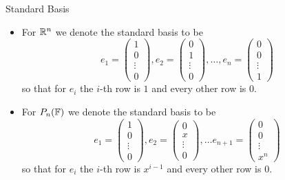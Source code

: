 \documentclass{exam}
\begin{document}
    \begin{example}{Standard Basis}{}
        \begin{itemize}
            \item For $\mathbb R^{n}$ we denote the standard basis to be 
            \[
                e_1 = \begin{pmatrix}
                    1 \\ 0 \\ \vdots \\ 0
                \end{pmatrix}, e_2 = \begin{pmatrix}
                    0 \\ 1 \\ \vdots \\ 0
                \end{pmatrix}, \dots, e_n = \begin{pmatrix}
                    0 \\ 0 \\ \vdots \\ 1
                \end{pmatrix}
            \]
            so that for $e_i$ the $i$-th row is $1$ and every other row is $0$. 

            \item For $P_n(\mathbb F)$ we denote the standard basis to be 
            \[
                e_1 = \begin{pmatrix}
                    1 \\ 0 \\ \vdots \\ 0
                \end{pmatrix},
                e_2 = \begin{pmatrix}
                    0 \\ x \\ \vdots \\ 0
                \end{pmatrix},
                \dots e_{n+1} = \begin{pmatrix}
                    0 \\ 0 \\ \vdots \\ x^{n}
                \end{pmatrix}
            \]
            so that for $e_i$ the $i$-th row is $x^{i-1}$ and every other row is $0$.
        \end{itemize}
    \end{example}
\end{document}
